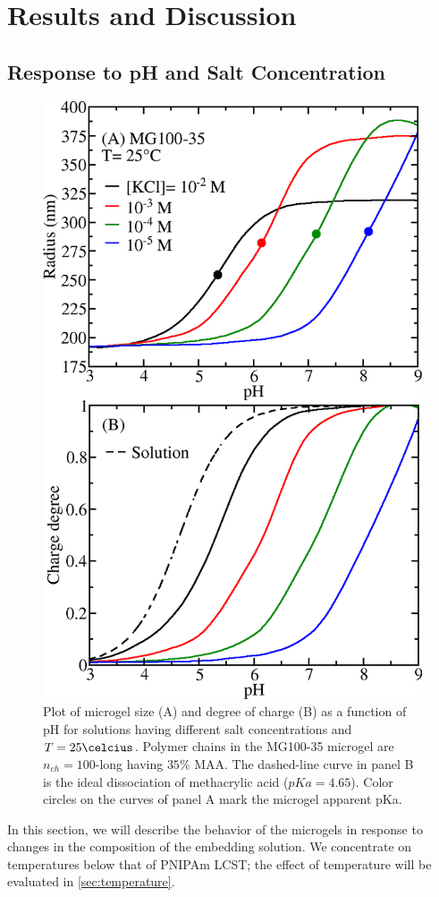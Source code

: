 \section{Results and Discussion}



\subsection{Response to pH and Salt Concentration}\label{sec:pH_salt}


\begin{figure}[!ht]
\centering
\includegraphics[width=0.5\linewidth]{Figures/graph-gel/R-pH.png}
\caption{Plot of microgel size (A) and degree of charge (B) as a function of pH for solutions having different salt concentrations and $T=25\celcius$.
Polymer chains in the MG100-35 microgel are $n_{ch}=100$-long having $35\% $ MAA.
The dashed-line curve in panel B is the ideal dissociation of methacrylic acid ($pKa=4.65$).
Color circles on the curves of panel A mark the microgel apparent pKa.}
\label{fig:R-pH}
\end{figure}


In this section, we will describe the behavior of the microgels in response to changes in the composition of the embedding solution.
We concentrate on temperatures below that of PNIPAm LCST;
the effect of temperature will be evaluated in \ref{sec:temperature}.

